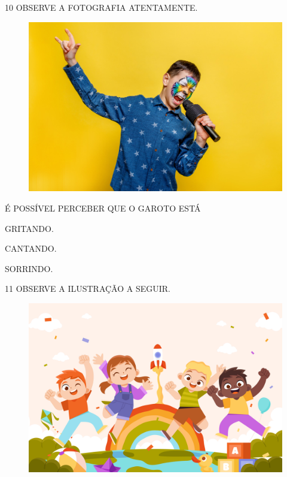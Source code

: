 \vspace{0.2cm}

\num{10} OBSERVE A FOTOGRAFIA ATENTAMENTE.

\begin{figure}[H]
\centering
\includegraphics[width=.7\textwidth]{media/image268.png}
\end{figure}

É POSSÍVEL PERCEBER QUE O GAROTO ESTÁ

\begin{multicols}{3}
\begin{boxlist}
 GRITANDO. 

 CANTANDO.

 SORRINDO.
\end{boxlist}
\end{multicols}

\pagebreak

\num{11} OBSERVE A ILUSTRAÇÃO A SEGUIR.

\begin{figure}[H]
\centering
\includegraphics[width=\textwidth]{media/image174.jpg}
\end{figure}

